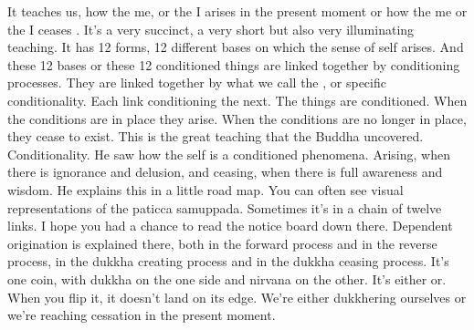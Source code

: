 \documentclass[letterpaper,10pt,english]{sphinxmanual}
\begin{document}
\sphinxAtStartPar
It teaches us, how the me, or the I arises in the present moment or how
the  me  or  the  I  ceases
.  It’s  a  very  succinct,  a  very
short but also very illuminating teaching. It has 12 forms, 12 different bases
on  which  the  sense  of  self  arises. And  these  12  bases  or  these  12  conditioned things are linked together by conditioning processes. They are linked
together by what we call the
, or specific conditionality. Each
link conditioning the next.
The things are conditioned. When the conditions are in place
  they arise. When the conditions are no longer in place, they cease to exist.
This is the great teaching that the Buddha uncovered. Conditionality. He saw
how the self is a conditioned phenomena. Arising, when there is ignorance
and  delusion,  and  ceasing,  when  there  is  full  awareness  and  wisdom.  He
explains this in a little road map. You can often see visual representations of
the paticca samuppada. Sometimes it’s in a chain of twelve links. I hope you
had a chance to read the notice board down there. Dependent origination is
explained there, both in the forward process and in the reverse process, in
the dukkha creating process and in the dukkha ceasing process. It’s one coin,
with dukkha on the one side and nirvana on the other. It’s either or. When
you flip it, it doesn’t land on its edge. We’re either dukkhering ourselves or
we’re reaching cessation in the present moment.
\end{document}
